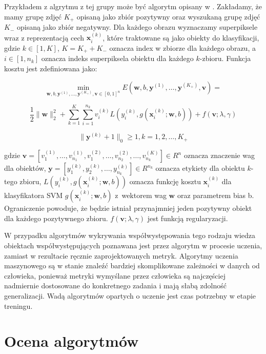 \documentclass[a4paper,11pt, notitlepage, twosides, openany ]{report}
\begin{document}
	Przykładem z algrytmu z tej grupy może być algorytm opisany w \cite{10.1109/TPAMI.2016.2567393}. Zakładamy, że mamy grupę zdjęć $K_+$ opisaną jako zbiór pozytywny oraz wyszukaną grupę zdjęć $K_-$ opisaną jako zbiór negatywny. Dla każdego obrazu wyznaczamy superpiksele wraz z reprezentacją cech $\mathbf{x}_i^{(k)}$, które traktowane są jako obiekty do klasyfikacji, gdzie $k \in [1, K]$, $K=K_+ + K_-$ oznacza index w zbiorze dla każdego obrazu, a $i \in [1, n_k]$ oznacza indeks superpiksela obiektu dla każdego $k$-zbioru. Funkcja kosztu jest zdefiniowana jako:

	$$
		\min_{\mathbf{w},b,\mathbf{y}^{(1)}, \dots, \mathbf{y}^{(K_+)},\mathbf{v}\in[0,1]^n} E(\mathbf{w},b,\mathbf{y}^{(1)}, \dots, \mathbf{y}^{(K_+)},\mathbf{v}) = 
	$$

	$$
	\frac{1}{2} \|\mathbf{w}\|^2_2 + \sum_{k=1}^K \sum_{i=1}^{n_k}v_i^{(k)} L(y_i^{(k)}, g(\mathbf{x}^{(k)}_i;\mathbf{w},b)) + f(\mathbf{v};\lambda, \gamma)
	$$

	$$
	\|\mathbf{y}^{(k)}+1\|_0 \geq 1, k=1,2,\dots,K_+
	$$

	gdzie $\mathbf{v} = [v_1^{(1)}, \dots, v_{n_1}^{(1)}, v_{1}^{(2)}, \dots, v_{n_2}^{(2)}, \dots, v_{n_k}^{(K)}] \in R^{n}$ oznacza znaczenie wag dla obiektów, $\mathbf{y} = [y_1^{(k)}, y_{2}^{(k)}, \dots, y_{n_k}^{(k)}] \in R^{n_k}$ oznacza etykiety dla obiektu $k$-tego zbioru, $L(y_i^{(k)}, g(\mathbf{x}^{(k)}_i;\mathbf{w},b))$ oznacza funkcję kosztu $\mathbf{x}_i^{(k)}$ dla klasyfikatora SVM $g(\mathbf{x}^{(k)}_i;\mathbf{w},b)$ z~wektorem wag $\mathbf{w}$ oraz parametrem bias b. Ograniczenie powoduje, że będzie istniał przynajmniej jeden pozytywny obiekt dla każdego pozytywnego zbioru. $f(\mathbf{v};\lambda, \gamma)$ jest funkcją regularyzacji.

	W przypadku algorytmów wykrywania współwystępowania tego rodzaju wiedza obiektach współwystępujących poznawana jest przez algorytm w procesie uczenia, zamiast w rezultacie ręcznie zaprojektowanych metryk. Algorytmy uczenia maszynowego są w stanie znaleźć bardziej skomplikowane zależności w danych od człowieka, ponieważ metryki wymyślane przez człowieka są najczęściej nadmiernie dostosowane do konkretnego zadania i mają słabą zdolność generalizacji. Wadą algorytmów opartych o uczenie jest czas potrzebny w etapie treningu.



	\section{Ocena algorytmów}
\end{document}
